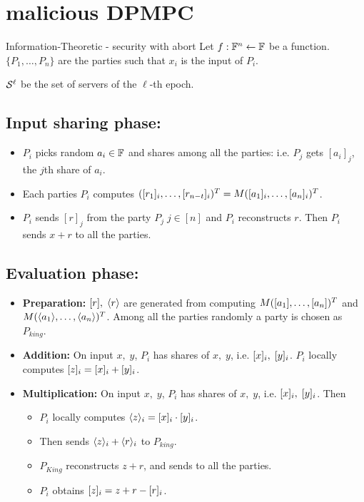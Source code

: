\section{malicious DPMPC}
Information-Theoretic - security with abort
Let $f:\mathbb{F}^n \leftarrow \mathbb{F}$ be a function. $\{P_1, \ldots, P_n\}$ are the parties such that $x_i$ is the input of $P_i$. 

$\mathcal{S}^{\ell}$ be the set of servers of the $\ell$-th epoch. 

\subsection{Input sharing phase: }
\begin{itemize}
	\item $P_i$ picks random $a_i\in \mathbb{F}$ and shares among all the parties: i.e. $P_j$ gets $[a_i]_j$, the $j$th share of $a_i$.
	
	\item Each parties $P_i$ computes 
	$([r_1]_i, \ldots, [r_{n-t}]_i)^T = M([a_1]_i, \ldots, [a_n]_i)^T$.
	
	\item $P_i$ sends $[r]_j$ from the party $P_j \; j\in[n]$ and $P_i$ reconstructs $r$. Then $P_i$ sends $x+r$ to all the parties.
\end{itemize}
\subsection{Evaluation phase: }
\begin{itemize}
	\item {\bf Preparation:} $[r],\;\langle r \rangle$ are generated from computing $M([a_1],\ldots, [a_n])^T$ and $M(\langle a_1 \rangle,\ldots, \langle a_n \rangle)^T$. Among all the parties randomly a party is chosen as $P_{king}$.
	
	\item {\bf Addition:} On input $x,\;y$, $P_i$ has shares of $x,\;y$, i.e. $[x]_i,\;[y]_i$. $P_i$  locally computes $[z]_i = [x]_i+[y]_i$.
	
	\item {\bf Multiplication:} On input $x,\;y$, $P_i$ has shares of $x, \;y$, i.e. $[x]_i,\;[y]_i$. Then 
	\begin{itemize}
		\item $P_i$ locally computes $\langle z \rangle_i = [x]_i\cdot [y]_i$. 
		\item Then sends $\langle z \rangle_i +\langle r \rangle_i$ to $P_{king}$.
		\item $P_{King}$ reconstructs $z+r$, and sends to all the parties.
		\item $P_i$ obtains $[z]_i = z+r - [r]_i$.
	\end{itemize}
\end{itemize}

